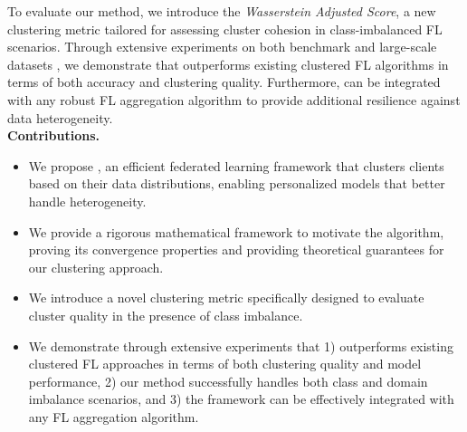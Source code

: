 To evaluate our method, we introduce the \textit{Wasserstein Adjusted Score}, a new clustering metric tailored for assessing cluster cohesion in class-imbalanced FL scenarios. Through extensive experiments on both benchmark \citep{caldas2018leaf} and large-scale datasets \citep{hsu2020federated}, we demonstrate that \shortname outperforms existing clustered FL algorithms in terms of both accuracy and clustering quality. Furthermore, \shortname can be integrated with any robust FL aggregation algorithm to provide additional resilience against data heterogeneity. \\
\textbf{Contributions.}
\begin{itemize}[leftmargin=*]
\setlength{\itemsep}{-.5em} 
    \item We propose \shortname, an efficient federated learning framework that clusters clients based on their data distributions, enabling personalized models that better handle heterogeneity.
    \item We provide a rigorous mathematical framework to motivate the algorithm, proving its convergence properties and providing theoretical guarantees for our clustering approach.
    \item We introduce a novel clustering metric specifically designed to evaluate cluster quality in the presence of class imbalance. 
    \item We demonstrate through extensive experiments that 1) \shortname outperforms existing clustered FL approaches in terms of both clustering quality and model performance, 2) our method successfully handles both class and domain imbalance scenarios, and 3) the framework can be effectively integrated with any FL aggregation algorithm.
\end{itemize}

